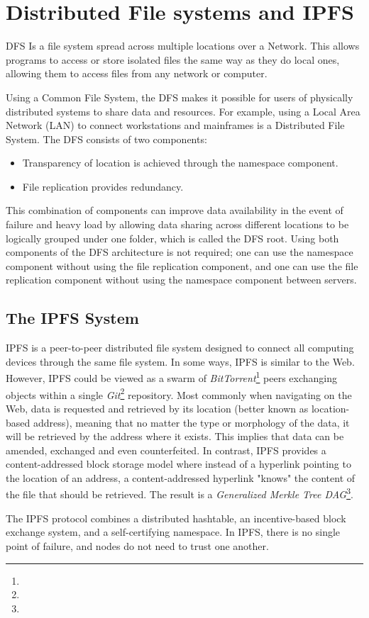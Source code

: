 \section{Distributed File systems and IPFS}
\ac{DFS} Is a file system spread across multiple locations over a Network. This allows programs to access or store isolated files the same way as they do local ones, allowing them to access files from any network or computer.

Using a Common File System, the \ac{DFS} makes it possible for users of physically distributed systems to share data and resources. For example, using a Local Area Network (LAN) to connect workstations and mainframes is a Distributed File System.
The DFS consists of two components: 
\begin{itemize}
    \item Transparency of location is achieved through the namespace component. 
    \item File replication provides redundancy.
\end{itemize}

This combination of components can improve data availability in the event of failure and heavy load by allowing data sharing across different locations to be logically grouped under one folder, which is called the DFS root. 
Using both components of the \ac{DFS} architecture is not required; one can use the namespace component without using the file replication component, and one can use the file replication component without using the namespace component between servers.

\subsection{The IPFS System}
\ac{IPFS} is a peer-to-peer distributed file system designed to connect all computing devices through the same file system. In some ways, IPFS is similar to the Web. However, \ac{IPFS} could be viewed as a swarm of \emph{BitTorrent}\footnote{} peers exchanging objects within a single \emph{Git}\footnote{} repository. Most commonly when navigating on the Web, data is requested and retrieved by its location (better known as location-based address), meaning that no matter the type or morphology of the data, it will be retrieved by the address where it exists. This implies that data can be amended, exchanged and even counterfeited. In contrast, \ac{IPFS} provides a content-addressed block storage model where instead of a hyperlink pointing to the location of an address,  a content-addressed hyperlink "knows" the content of the file that should be retrieved. The result is a \emph{Generalized Merkle Tree \ac{DAG}}\footnote{}.\cite{benet2014ipfs}

The \ac{IPFS} protocol combines a distributed hashtable, an incentive-based block exchange system, and a self-certifying namespace. In IPFS, there is no single point of failure, and nodes do not need to trust one another.